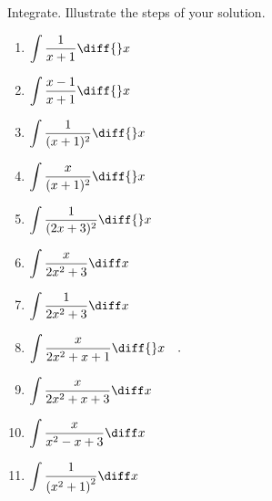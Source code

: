 Integrate. Illustrate the steps of your solution. %
\begin{multicols}{2}
\begin{enumerate}[ref={\fcProblemRef}]
\item $\displaystyle \int \frac{1}{x+1}\diff {}x$

\item $\displaystyle \int \frac{x-1}{x+1}\diff {}x$


\item $\displaystyle \int \frac{ 1}{(x+1)^2}\diff {}x$


\item $\displaystyle \int \frac{x}{(x+1)^2}\diff {}x$


\item $\displaystyle \int \frac{ 1}{ (2x+3)^2}\diff {}x$

\item $\displaystyle
\int \frac{x}{ 2x^2+3}\diff x
$


\item $\displaystyle
\int \frac{1}{ 2x^2+3}\diff x
$


\item \label{problemIntegrate x/(2x^2+x+1) dx}
$\displaystyle\int \frac{x }{2x^2+x+1}\diff{}x\quad .
$

\item $\displaystyle
\int \frac{x}{ 2x^2+x+3}\diff x
$

\item $\displaystyle
\int \frac{x}{ x^2-x+3}\diff x
$

\item $\displaystyle
\int \frac{1}{ \left(x^2+1\right)^2}\diff x
$


\end{enumerate}
\end{multicols}
